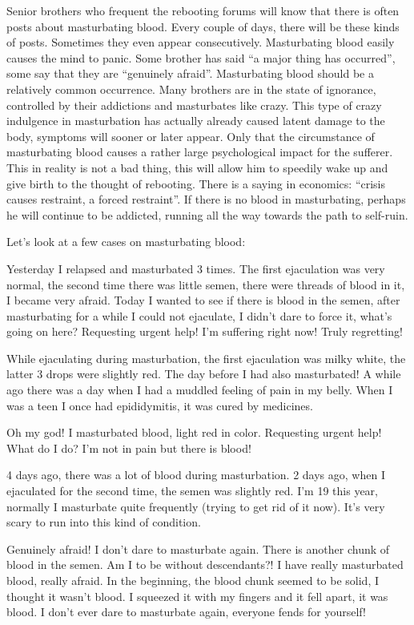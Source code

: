 \documentclass[
]{book}
\begin{document}
Senior brothers who frequent the rebooting forums will know that there is often posts about masturbating blood. Every couple of days, there will be these kinds of posts. Sometimes they even appear consecutively. Masturbating blood easily causes the mind to panic. Some brother has said ``a major thing has occurred'', some say that they are ``genuinely afraid''. Masturbating blood should be a relatively common occurrence. Many brothers are in the state of ignorance, controlled by their addictions and masturbates like crazy. This type of crazy indulgence in masturbation has actually already caused latent damage to the body, symptoms will sooner or later appear. Only that the circumstance of masturbating blood causes a rather large psychological impact for the sufferer. This in reality is not a bad thing, this will allow him to speedily wake up and give birth to the thought of rebooting. There is a saying in economics: ``crisis causes restraint, a forced restraint''. If there is no blood in masturbating, perhaps he will continue to be addicted, running all the way towards the path to self-ruin.

Let's look at a few cases on masturbating blood:

Yesterday I relapsed and masturbated 3 times. The first ejaculation was very normal, the second time there was little semen, there were threads of blood in it, I became very afraid. Today I wanted to see if there is blood in the semen, after masturbating for a while I could not ejaculate, I didn't dare to force it, what's going on here? Requesting urgent help! I'm suffering right now! Truly regretting!

While ejaculating during masturbation, the first ejaculation was milky white, the latter 3 drops were slightly red. The day before I had also masturbated! A while ago there was a day when I had a muddled feeling of pain in my belly. When I was a teen I once had epididymitis, it was cured by medicines.

Oh my god! I masturbated blood, light red in color. Requesting urgent help! What do I do? I'm not in pain but there is blood!

4 days ago, there was a lot of blood during masturbation. 2 days ago, when I ejaculated for the second time, the semen was slightly red. I'm 19 this year, normally I masturbate quite frequently (trying to get rid of it now). It's very scary to run into this kind of condition.

Genuinely afraid! I don't dare to masturbate again. There is another chunk of blood in the semen. Am I to be without descendants?! I have really masturbated blood, really afraid. In the beginning, the blood chunk seemed to be solid, I thought it wasn't blood. I squeezed it with my fingers and it fell apart, it was blood. I don't ever dare to masturbate again, everyone fends for yourself!
\end{document}
